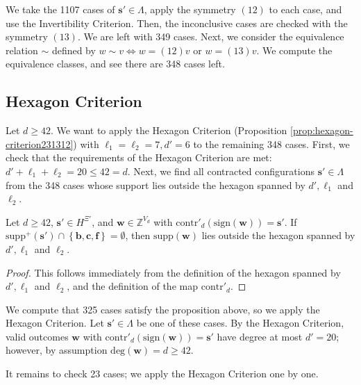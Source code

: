 We take the 1107 cases of \( \mathbf{s}' \in \Lambda \), apply the symmetry \( (12) \) to each case, and use the Invertibility Criterion. Then, the inconclusive cases are checked with the symmetry \( (13) \). We are left with 349 cases. Next, we consider the equivalence relation $\sim$ defined by $w \sim v \iff w = (12) v \text{ or } w = (13)v$. We compute the equivalence classes, and see there are 348 cases left. 

\subsection{Hexagon Criterion}

Let \( d \geq 42 \). We want to apply the Hexagon Criterion (Proposition \ref{prop:hexagon-criterion231312}) with \( \ell_1 = \ell_2 = 7, d' = 6 \) to the remaining 348 cases.
First, we check that the requirements of the Hexagon Criterion are met: \( d' + \ell_1 + \ell_2  = 20 \leq 42 = d \). Next, we find all contracted configurations \( \mathbf{s}' \in \Lambda \) from the 348 cases whose support lies outside the hexagon spanned by \( d', \ell_1 \) and \( \ell_2 \).

\begin{proposition}
    Let \( d \geq 42 \), \( \mathbf{s}' \in H^{\Xi'} \), and \( \mathbf{w} \in \mathbb{Z}^{V_d} \) with \( \mathrm{contr}'_d(\mathrm{sign}(\mathbf{w})) = \mathbf{s}' \). If \( \mathrm{supp}^+(\mathbf{s}') \cap \left\{ \mathbf{b}, \mathbf{c}, \mathbf{f} \right\} = \emptyset\), then \( \mathrm{supp}(\mathbf{w}) \) lies outside the hexagon spanned by \( d', \ell_1 \) and \( \ell_2 \).
\end{proposition}

\begin{proof}
    This follows immediately from the definition of the hexagon spanned by \( d', \ell_1 \) and \( \ell_2 \), and the definition of the map \( \mathrm{contr}'_d \).
\end{proof}

We compute that 325 cases satisfy the proposition above, so we apply the Hexagon Criterion. Let \( \mathbf{s}' \in \Lambda \) be one of these cases. By the Hexagon Criterion, valid outcomes \( \mathbf{w} \) with \( \mathrm{contr}'_d(\mathrm{sign}(\mathbf{w})) = \mathbf{s}' \) have degree at most \( d' = 20 \); however, by assumption \( \mathrm{deg}(\mathbf{w}) = d \geq 42 \). 

It remains to check 23 cases; we apply the Hexagon Criterion one by one.


